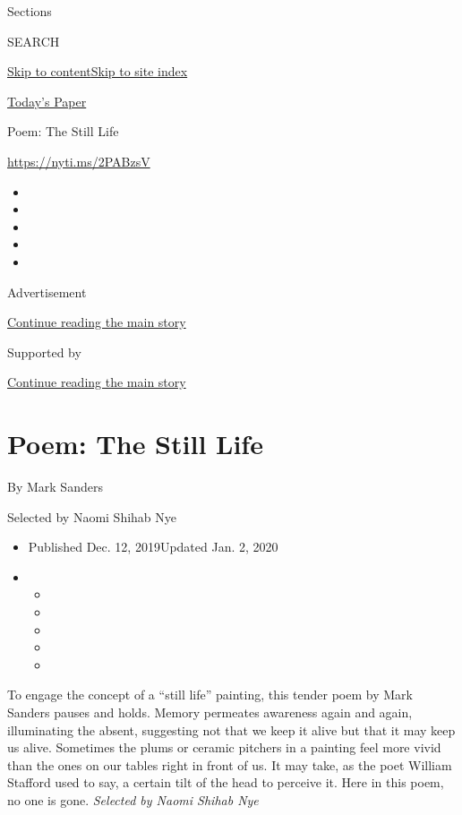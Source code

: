 Sections

SEARCH

\protect\hyperlink{site-content}{Skip to
content}\protect\hyperlink{site-index}{Skip to site index}

\href{https://myaccount.nytimes3xbfgragh.onion/auth/login?response_type=cookie\&client_id=vi}{}

\href{https://www.nytimes3xbfgragh.onion/section/todayspaper}{Today's
Paper}

Poem: The Still Life

\url{https://nyti.ms/2PABzsV}

\begin{itemize}
\item
\item
\item
\item
\item
\end{itemize}

Advertisement

\protect\hyperlink{after-top}{Continue reading the main story}

Supported by

\protect\hyperlink{after-sponsor}{Continue reading the main story}

\hypertarget{poem-the-still-life}{%
\section{Poem: The Still Life}\label{poem-the-still-life}}

By Mark Sanders

Selected by Naomi Shihab Nye

\begin{itemize}
\item
  Published Dec. 12, 2019Updated Jan. 2, 2020
\item
  \begin{itemize}
  \item
  \item
  \item
  \item
  \item
  \end{itemize}
\end{itemize}

To engage the concept of a ``still life'' painting, this tender poem by
Mark Sanders pauses and holds. Memory permeates awareness again and
again, illuminating the absent, suggesting not that we keep it alive but
that it may keep us alive. Sometimes the plums or ceramic pitchers in a
painting feel more vivid than the ones on our tables right in front of
us. It may take, as the poet William Stafford used to say, a certain
tilt of the head to perceive it. Here in this poem, no one is gone.
\emph{Selected by Naomi Shihab Nye}

